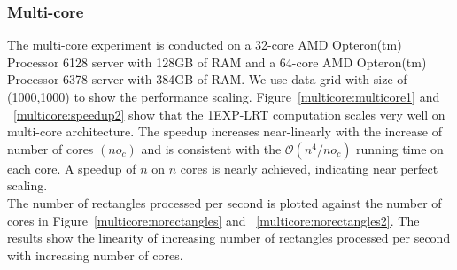 \documentclass[AMA,LATO1COL]{WileyNJD-v2}
\newcommand\bigo{\mathcal O}
\begin{document}
\subsubsection{Multi-core}
 The multi-core experiment is conducted on a 32-core AMD Opteron(tm) Processor 6128 server with 128GB of RAM and a 64-core AMD Opteron(tm) Processor 6378 server with 384GB of RAM. We use data grid with size of (1000,1000) to show the performance scaling. Figure~\ref{multicore:multicore1} and ~\ref{multicore:speedup2} show that the 1EXP-LRT computation scales very well on multi-core architecture.  The speedup increases near-linearly with the increase of number of cores $(no_c)$ and is consistent with the $\bigo(n^4/no_c)$ running time on each core. A speedup of $n$ on $n$ cores is nearly achieved, indicating near perfect scaling.\\
The number of rectangles processed per second is plotted against the number of cores in Figure~\ref{multicore:norectangles} and ~\ref{multicore:norectangles2}. The results show the linearity of increasing number of rectangles processed per second with increasing number of cores.
\end{document}
